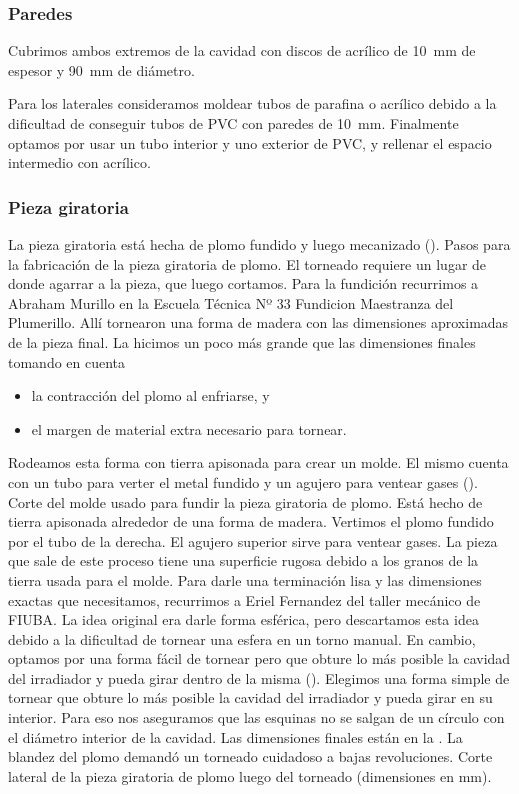 \subsubsection{Paredes}
Cubrimos ambos extremos de la cavidad con discos de acrílico
de \SI{10}{\milli\meter} de espesor y \SI{90}{\milli\meter} de diámetro.

Para los laterales consideramos moldear tubos de parafina o acrílico
debido a la dificultad de conseguir tubos de PVC con paredes de
\SI{10}{\milli\meter}.
Finalmente optamos por usar un tubo interior y uno exterior de PVC,
y rellenar el espacio intermedio con acrílico.
\subsubsection{Pieza giratoria}
La pieza giratoria está hecha de plomo fundido y luego mecanizado
().
{Pasos para la fabricación de la pieza giratoria de plomo.
El torneado requiere un lugar de donde agarrar a la pieza,
que luego cortamos.}
Para la fundición recurrimos a Abraham Murillo en la 
Escuela Técnica Nº 33 Fundicion Maestranza del Plumerillo. 
Allí tornearon una forma de madera con las dimensiones aproximadas de la pieza final.
La hicimos un poco más grande que las dimensiones finales tomando en cuenta
\begin{itemize}
    \item la contracción del plomo al enfriarse, y
    \item el margen de material extra necesario para tornear.
\end{itemize}
Rodeamos esta forma con tierra apisonada para crear un molde.
El mismo cuenta con un tubo para verter el metal fundido 
y un agujero para ventear gases
().
{Corte del molde usado para fundir la pieza giratoria de plomo.
Está hecho de tierra apisonada alrededor de una forma de madera.
Vertimos el plomo fundido por el tubo de la derecha.
El agujero superior sirve para ventear gases.}
La pieza que sale de este proceso tiene una superficie rugosa
debido a los granos de la tierra usada para el molde.
Para darle una terminación lisa y las dimensiones exactas que necesitamos,
recurrimos a Eriel Fernandez del taller mecánico de FIUBA.
La idea original era darle forma esférica,
pero descartamos esta idea debido a la dificultad
de tornear una esfera en un torno manual.
En cambio, optamos por una forma fácil de tornear
pero que obture lo más posible la cavidad del irradiador 
y pueda girar dentro de la misma
().
{Elegimos una forma simple de tornear que obture lo más posible 
la cavidad del irradiador y pueda girar en su interior.
Para eso nos aseguramos que las esquinas no se salgan de un círculo
con el diámetro interior de la cavidad.}
Las dimensiones finales están en la .
La blandez del plomo demandó un torneado cuidadoso a bajas revoluciones.
{Corte lateral de la pieza giratoria de plomo luego del torneado
(dimensiones en mm).}
